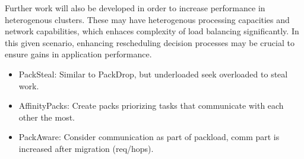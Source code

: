 Further work will also be developed in order to increase performance in heterogenous clusters.
These may have heterogenous processing capacities and network capabilities, which enhaces complexity of load balancing significantly.
In this given scenario, enhancing rescheduling decision processes may be crucial to ensure gains in application performance.

\begin{itemize}
	\item PackSteal: Similar to PackDrop, but underloaded seek overloaded to steal work.
	\item AffinityPacks: Create packs priorizing tasks that communicate with each other the most.
	\item PackAware: Consider communication as part of packload, comm part is increased after migration (req/hops).
\end{itemize}